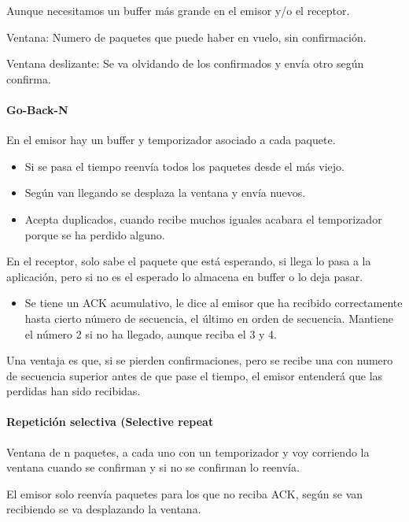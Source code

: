 \documentclass[12pt, twoside, openright]{report} %
\begin{document}
Aunque necesitamos un buffer más grande en el emisor y/o el
receptor.

Ventana: Numero de paquetes que puede haber en vuelo, sin
confirmación.

Ventana deslizante: Se va olvidando de los confirmados y envía
otro según confirma.

\paragraph{Go-Back-N}



En el emisor hay un buffer y temporizador asociado a cada
paquete.

\begin{itemize}
	\item Si se pasa el tiempo reenvía todos los paquetes desde el más
	      viejo.
	\item Según van llegando se desplaza la ventana y envía nuevos.
	\item Acepta duplicados, cuando recibe muchos iguales acabara el
	      temporizador porque se ha perdido alguno.
\end{itemize}

En el receptor, solo sabe el paquete que está esperando, si
llega lo pasa a la aplicación, pero si no es el esperado lo
almacena en buffer o lo deja pasar.

\begin{itemize}
	\item Se tiene un ACK acumulativo, le dice al emisor que ha recibido
	      correctamente hasta cierto número de secuencia, el último en
	      orden de secuencia. Mantiene el número 2 si no ha llegado,
	      aunque reciba el 3 y 4.
\end{itemize}

Una ventaja es que, si se pierden confirmaciones, pero se recibe
una con numero de secuencia superior antes de que pase el
tiempo, el emisor entenderá que las perdidas han sido recibidas.

\paragraph{Repetición selectiva (Selective repeat}

Ventana de n paquetes, a cada uno con un temporizador y voy
corriendo la ventana cuando se confirman y si no se confirman lo
reenvía.

El emisor solo reenvía paquetes para los que no reciba ACK,
según se van recibiendo se va desplazando la ventana.
\end{document}
